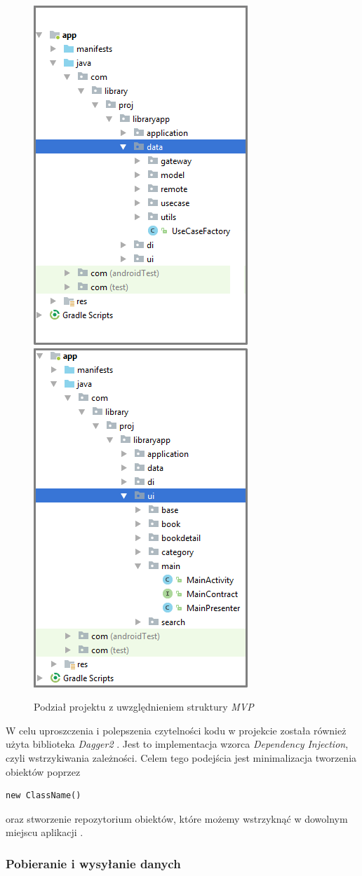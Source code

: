 \documentclass[twoside]{projektInzynierskiMS}
\begin{document}
\begin{figure}[h]
  \centering
  \includegraphics[width=0.4\linewidth]{img/android/mvpData.png}
  \includegraphics[width=0.4\linewidth]{img/android/mvpMainActivity.png}
  \caption{Podział projektu z uwzględnieniem struktury \textit{MVP}}
  \label{fig:mvpProject}
\end{figure}

W celu uproszczenia i polepszenia czytelności kodu w projekcie została również użyta biblioteka \textit{Dagger2} \cite{dagger2}.
Jest to implementacja wzorca \textit{Dependency Injection}, czyli wstrzykiwania zależności. Celem tego podejścia jest minimalizacja tworzenia obiektów poprzez 
\begin{verbatim}
new ClassName()
\end{verbatim}
oraz stworzenie repozytorium obiektów, które możemy wstrzyknąć w
dowolnym miejscu aplikacji \cite{PPPAndroida}.

\subsubsection{Pobieranie i wysyłanie danych}
\end{document}
